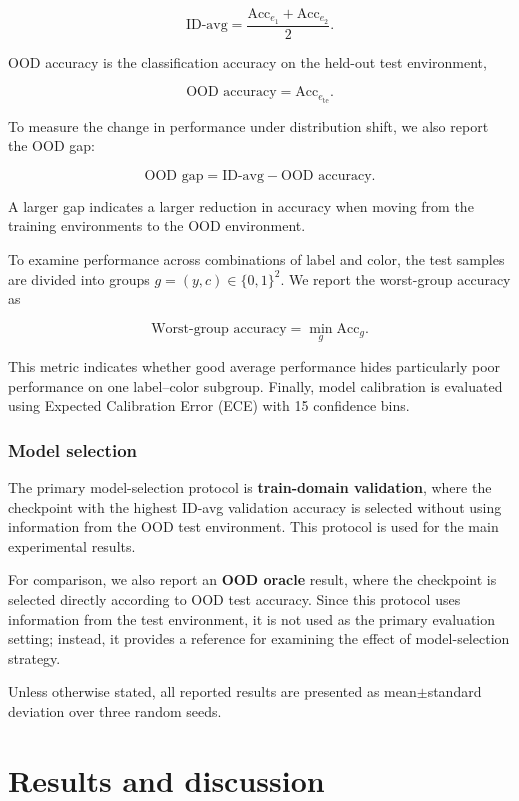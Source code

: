 \documentclass[12pt,a4paper]{article}
\begin{document}
\[
\text{ID-avg}
=
\frac{\mathrm{Acc}_{e_1}+\mathrm{Acc}_{e_2}}{2}.
\]

OOD accuracy is the classification accuracy on the held-out test environment,

\[
\text{OOD accuracy}
=
\mathrm{Acc}_{e_{\mathrm{te}}}.
\]

To measure the change in performance under distribution shift, we also report the
OOD gap:

\[
\text{OOD gap}
=
\text{ID-avg} - \text{OOD accuracy}.
\]

A larger gap indicates a larger reduction in accuracy when moving from the training
environments to the OOD environment.

To examine performance across combinations of label and color, the test samples are
divided into groups $g=(y,c)\in\{0,1\}^2$. We report the worst-group accuracy as

\[
\text{Worst-group accuracy}
=
\min_g \mathrm{Acc}_g.
\]

This metric indicates whether good average performance hides particularly poor
performance on one label--color subgroup. Finally, model calibration is evaluated
using Expected Calibration Error (ECE) with 15 confidence bins.

\subsubsection{Model selection}
The primary model-selection protocol is \textbf{train-domain validation}, where the
checkpoint with the highest ID-avg validation accuracy is selected without using
information from the OOD test environment. This protocol is used for the main
experimental results.

For comparison, we also report an \textbf{OOD oracle} result, where the checkpoint is
selected directly according to OOD test accuracy. Since this protocol uses information
from the test environment, it is not used as the primary evaluation setting; instead,
it provides a reference for examining the effect of model-selection strategy.

Unless otherwise stated, all reported results are presented as mean$\pm$standard
deviation over three random seeds.

\clearpage
\section{Results and discussion}\label{sec:results}
\end{document}
